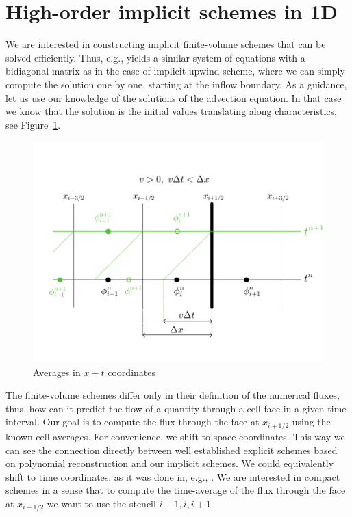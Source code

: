 \documentclass[../thesis.tex]{subfiles}
\begin{document}
\graphicspath{ {./img/}{./tab/} }
\section[]{High-order implicit schemes in 1D}
We are interested in constructing implicit finite-volume schemes that can be solved efficiently. Thus, e.g., yields a similar system of equations with a bidiagonal matrix as in the case of implicit-upwind scheme, where we can simply compute the solution one by one, starting at the inflow boundary.
As a guidance, let us use our knowledge of the solutions of the advection equation. In that case we know that the solution is the initial values translating along characteristics, see Figure~\ref{fig:characteristics-1d}.
\begin{figure}[H]
	\centering
	\includegraphics[width=\textwidth]{Characteristics-crop.pdf}
	\caption{Averages in \(x-t\) coordinates}
	\label{fig:characteristics-1d}
\end{figure}
The finite-volume schemes differ only in their definition of the numerical fluxes, thus, how can it predict the flow of a quantity through a cell face in a given time interval.
Our goal is to compute the flux through the face at \(x_{i+1/2}\) using the known cell averages.
For convenience, we shift to space coordinates.
This way we can see the connection directly between well established explicit schemes based on polynomial reconstruction \cite{1977_VanLeer,2002_LeVeque_BOOK} and our implicit schemes.
We could equivalently shift to time coordinates, as it was done in, e.g., \cite{2023_Barsukow,2022_Eimer}.
We are interested in compact schemes in a sense that to compute the time-average of the flux through the face at \(x_{i+1/2}\) we want to use the stencil \(i-1, i, i+1\).
\end{document}
